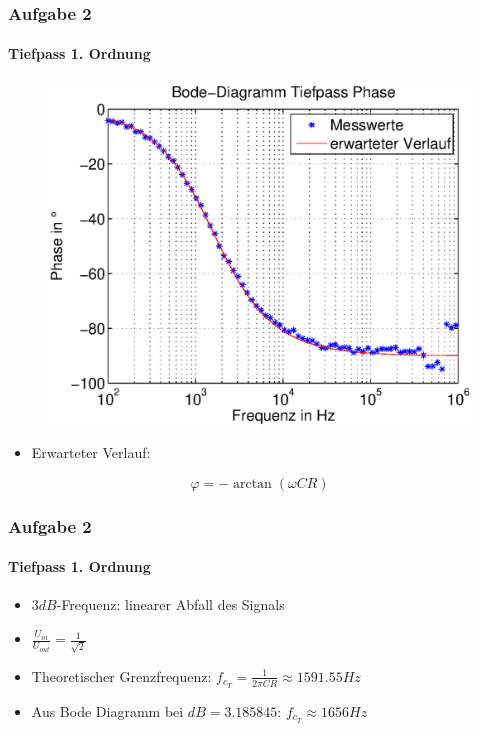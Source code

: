 \begin{frame}
\frametitle{Aufgabe 2}
\framesubtitle{Tiefpass 1. Ordnung}
\begin{figure}[H]
\begin{center}
        \includegraphics[scale=0.50]{./img/2a_bode_tief_phase.eps}
\end{center}
\end{figure}
\begin{itemize}
    \item Erwarteter Verlauf:
\end{itemize}
\begin{equation*}
    \varphi = - \arctan \left( \omega C R \right)
\end{equation*}
\end{frame}
\begin{frame}
    \frametitle{Aufgabe 2}
    \framesubtitle{Tiefpass 1. Ordnung}
\begin{itemize}
    \item $3dB$-Frequenz: linearer Abfall des Signals
    \item $\frac{U_{in}}{U_{out}}=\frac{1}{\sqrt{2}}$
    \item Theoretischer Grenzfrequenz: $f_{c_T} = \frac{1}{2 \pi C R} \approx
    1591.55Hz$
    \item Aus Bode Diagramm bei $dB=3.185845$: $f_{c_T} \approx 1656 Hz$
\end{itemize}
\end{frame}
